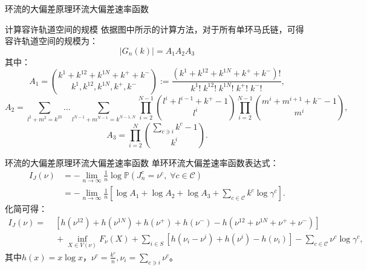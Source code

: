 \documentclass{beamer}
\begin{document}
\begin{frame}{环流的大偏差原理}{环流大偏差速率函数}
	\begin{block}{计算容许轨道空间的规模}
		依据图中所示的计算方法，对于所有单环马氏链，可得容许轨道空间的规模为：
		$$|G_n(k)|=A_1A_2A_3 $$
		其中：{\footnotesize
		\begin{equation*}\label{formula:A1}
			A_1 = \binom{k^1+k^{12}+k^{1N}+k^{+}+k^{-}}{k^1,k^{12},k^{1N},k^{+},k^{-}}
			:= \frac{(k^1+k^{12}+k^{1N}+k^{+}+k^{-})!}{k^1!\;k^{12}!\;k^{1N}!\;k^{+}!\;k^{-}!},
		\end{equation*}
		\begin{equation*}
			A_2 = \sum_{l^{2}+m^{2}=k^{23}}\dots\sum_{l^{N-1}+m^{N-1}=k^{N-1,N}}
			\prod_{i=2}^{N-1}\binom{l^{i}+l^{i-1}+k^{+}-1}{l^{i}}\prod_{i=2}^{N-1}\binom{m^{i}+m^{i+1}+k^{-}-1}{m^{i}},
		\end{equation*}
		\begin{equation*}\label{formula:A3}
			A_3 = \prod_{i=2}^N\binom{\sum_{c\ni i}k^{c}-1}{k^{i}}.
		\end{equation*}}
	\end{block}
\end{frame}

\begin{frame}{环流的大偏差原理}{环流大偏差速率函数}
	单环环流大偏差速率函数表达式：
	\begin{equation*}
		\begin{split}
			I_J(\nu) &= -\lim_{n\to\infty}\frac{1}{n}\log\mathbb{P}\left(J^c_n=\nu^c,\;\forall c\in\mathcal{C}\right)\\
			&= -\lim_{n\to\infty}\frac{1}{n}\left[\log A_1+\log A_2+\log A_3+\sum_{c\in\mathcal{C}}k^c\log\gamma^c\right].
		\end{split}
	\end{equation*}
	化简可得：
	\begin{equation*}\label{ratefunction}
		\begin{split}
			I_J(\nu) =&\; \left[h\left(\nu^{12}\right)+h\left(\nu^{1N}\right)
				+h\left(\nu^+\right)+h\left(\nu^-\right)-h\left(\nu^{12}+\nu^{1N}+\nu^++\nu^-\right)\right] \\
			&\;+\inf_{X\in V(\nu)}F_{\nu}(X)+\sum_{i\in S}\left[ h\left(\nu_i-\nu^i\right)+h\left(\nu^i\right)
				-h\left(\nu_i\right)\right]-\sum_{c\in\mathcal{C}}\nu^c\log\gamma^c,
		\end{split}
	\end{equation*}
	其中$h(x) = x \log x$，$\nu^c = \frac{k^c}{n}, \nu_i=\sum_{c\ni i}\nu^c$。
\end{frame}
\end{document}
